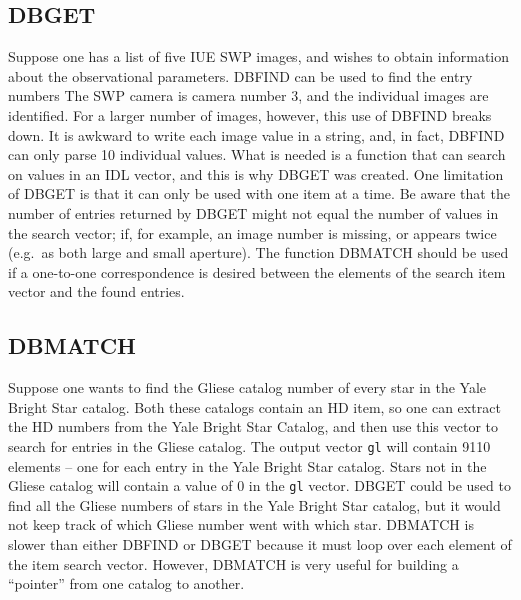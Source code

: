 \subsection{DBGET}
Suppose one has a list of five IUE SWP images, and wishes to obtain information
about the observational parameters.  DBFIND can be used to find the entry
numbers
The SWP camera is camera number 3, and the individual images are identified.
For a larger number of images, however, this use of DBFIND breaks down.
It is awkward to write each image value in a string, and, in fact, DBFIND
can only parse 10 individual values.   What is needed is a function that
can search on values in an IDL vector, and this is why DBGET was created.
\exbegin
{}
\exend
One limitation of DBGET is that it can only be used with one item at
a time.  Be aware that the number of entries returned by DBGET might
not equal the number of values in the search vector; if, for example,
an image number is missing, or appears twice (e.g.\ as both large 
and small aperture).   The function DBMATCH should be used if a one-to-one 
correspondence is desired between the elements of the search item vector
and the found entries.
\subsection{DBMATCH} 
    Suppose one wants to find the Gliese catalog number of every star in the
Yale Bright Star catalog.  Both these catalogs contain an HD item, so one
can extract the HD numbers from the Yale Bright Star Catalog, and then use
this vector to search for entries in the Gliese catalog.      
\exbegin
{}
\exend
The output vector {\tt gl} will contain 9110 elements -- one for each entry
in the Yale Bright Star catalog.  Stars not in the Gliese catalog will contain
a value of 0 in the {\tt gl} vector.   DBGET could be used 
to find all the Gliese numbers of stars in the Yale Bright Star catalog,
but it would not keep track of which Gliese number went with which star.
DBMATCH is slower than either DBFIND or DBGET because it must loop over
each element of the item search vector.  However, DBMATCH is very useful
for building a ``pointer'' from one catalog to another.
